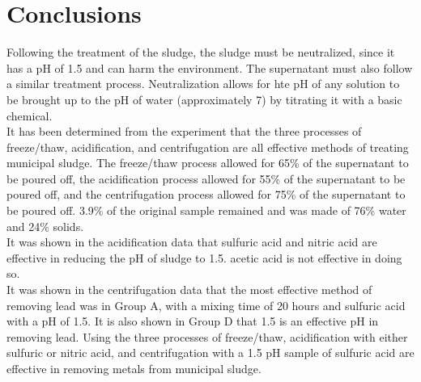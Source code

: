 \documentclass{article}
\begin{document}
    \section{Conclusions}
    \indent Following the treatment of the sludge, the sludge must be neutralized, since it has a pH of 1.5 and can harm the environment. The supernatant must also follow a similar treatment process. Neutralization allows for hte pH of any solution to be brought up to the pH of water (approximately 7) by titrating it with a basic chemical.\\
    \indent It has been determined from the experiment that the three processes of freeze/thaw, acidification, and centrifugation are all effective methods of treating municipal sludge. The freeze/thaw process allowed for 65\% of the supernatant to be poured off, the acidification process allowed for 55\% of the supernatant to be poured off, and the centrifugation process allowed for 75\% of the supernatant to be poured off. 3.9\% of the original sample remained and was made of 76\% water and 24\% solids.\\
    \indent It was shown in the acidification data that sulfuric acid and nitric acid are effective in reducing the pH of sludge to 1.5. acetic acid is not effective in doing so.\\ 
    \indent It was shown in the centrifugation data that the most effective method of removing lead was in Group A, with a mixing time of 20 hours and sulfuric acid with a pH of 1.5. It is also shown in Group D that 1.5 is an effective pH in removing lead. Using the three processes of freeze/thaw, acidification with either sulfuric or nitric acid, and centrifugation with a 1.5 pH sample of sulfuric acid are effective in removing metals from municipal sludge.
    \newpage
\end{document}
